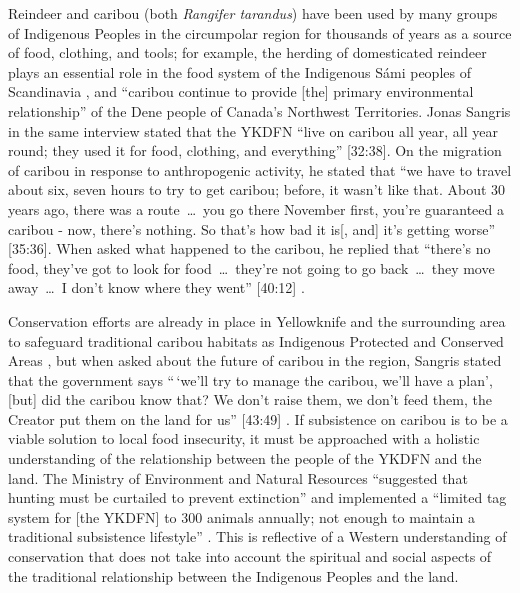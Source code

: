 \documentclass{report}
\begin{document}
\hspace{24pt} Reindeer and caribou (both \textit{Rangifer tarandus}) have been used by many groups of Indigenous Peoples in the circumpolar region for thousands of years as a source of food, clothing, and tools; for example, the herding of domesticated reindeer plays an essential role in the food system of the Indigenous S\'ami peoples of Scandinavia \parencite{traditionalsiberia}, and ``caribou continue to provide [the] primary environmental relationship'' \parencite[225]{denefoodwaysontologies} of the Dene people of Canada's Northwest Territories. 
Jonas Sangris in the same interview stated that the YKDFN ``live on caribou all year, all year round; they used it for food, clothing, and everything'' [32:38].
On the migration of caribou in response to anthropogenic activity, he stated that ``we have to travel about six, seven hours to try to get caribou; before, it wasn't like that. About 30 years ago, there was a route~\ldots~you go there November first, you're guaranteed a caribou - now, there's nothing. So that's how bad it is[, and] it's getting worse'' [35:36]. 
When asked what happened to the caribou, he replied that ``there's no food, they've got to look for food~\ldots~they're not going to go back~\ldots~they move away~\ldots~I don't know where they went'' [40:12] \parencite{jonassangris}.

\hspace{24pt} Conservation efforts are already in place in Yellowknife and the surrounding area to safeguard traditional caribou habitats as Indigenous Protected and Conserved Areas \parencite{resilientcommunities}, but when asked about the future of caribou in the region, Sangris stated that the government says ``\,`we'll try to manage the caribou, we'll have a plan', [but] did the caribou know that? We don't raise them, we don't feed them, the Creator put them on the land for us'' [43:49] \parencite{jonassangris}.
If subsistence on caribou is to be a viable solution to local food insecurity, it must be approached with a holistic understanding of the relationship between the people of the YKDFN and the land. The Ministry of Environment and Natural Resources ``suggested that hunting must be curtailed to prevent extinction'' and implemented a ``limited tag system for [the YKDFN] to 300 animals annually; not enough to maintain a traditional subsistence lifestyle'' \parencite[230]{denefoodwaysontologies}. This is reflective of a Western understanding of conservation that does not take into account the spiritual and social aspects of the traditional relationship between the Indigenous Peoples and the land.
\end{document}
